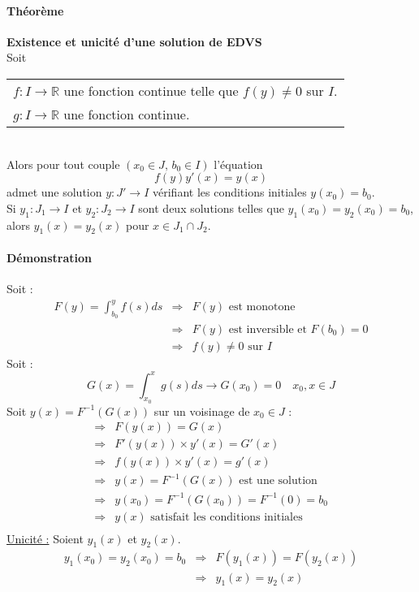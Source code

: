\documentclass[1Opt]{report}
\begin{document}
\paragraph{Théorème}
\textbf{Existence et unicité d'une solution de EDVS} \\
Soit
\begin{tabular}{l}
  $f:I\rightarrow{\mathbb R}$ une fonction continue telle que $f(y)\neq0$ sur $I$. \\
  $g:I\rightarrow{\mathbb R}$ une fonction continue.
\end{tabular} \\
Alors pour tout couple $(x_0\in J,\,b_0\in I)$ l'équation
\begin{equation*}
  f(y)y'(x)=y(x) \tag{$\ast \ast$}
\end{equation*}
admet une solution $y:J'\rightarrow I$ vérifiant les conditions initiales
$y(x_0)=b_0$. \\
Si $y_1:J_1\rightarrow I$ et $y_2:J_2\rightarrow I$ sont deux solutions telles
que $y_1(x_0)=y_2(x_0)=b_0$, alors $y_1(x)=y_2(x)$ pour $x\in J_1\cap J_2$.

\paragraph{Démonstration}
Soit :
\begin{eqnarray*}
  F(y)=\int_{b_0}^y f(s)ds & \Rightarrow & F(y) \mbox{ est monotone} \\
  & \Rightarrow & F(y) \mbox{ est inversible et } F(b_0)=0 \\
  & \Rightarrow & f(y)\neq0 \mbox{ sur } I
\end{eqnarray*}
Soit :
\[ G(x)=\int^x_{x_0}g(s)ds\rightarrow G(x_0)=0 \quad x_0,x\in J \]
Soit $y(x)=F^{-1}(G(x))$ sur un voisinage de $x_0\in J$ :
\begin{eqnarray*}
  \Rightarrow & F(y(x))=G(x) \\
  \Rightarrow & F'(y(x))\times y'(x)=G'(x) \\
  \Rightarrow & f(y(x))\times y'(x)=g'(x) \\
  \Rightarrow & y(x)=F^{-1}(G(x)) \mbox{ est une solution} \\
  \Rightarrow & y(x_0)=F^{-1}(G(x_0))=F^{-1}(0)=b_0 \\
  \Rightarrow & y(x) \mbox{ satisfait les conditions initiales} \\
\end{eqnarray*}
\underline{Unicité :} Soient $y_1(x)$ et $y_2(x)$.
\begin{eqnarray*}
  y_1(x_0)=y_2(x_0)=b_0 & \Rightarrow & F(y_1(x))=F(y_2(x)) \\
  & \Rightarrow & y_1(x)=y_2(x)
\end{eqnarray*}
\end{document}
